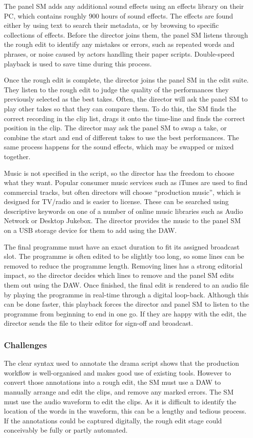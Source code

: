 The panel SM adds any additional sound effects using an effects library on their PC, which contains roughly 900 hours
of sound effects.  The effects are found either by using text to search their metadata, or by browsing to specific
collections of effects.  Before the director joins them, the panel SM listens through the rough edit to identify any
mistakes or errors, such as repeated words and phrases, or noise caused by actors handling their paper scripts.
Double-speed playback is used to save time during this process.

Once the rough edit is complete, the director joins the panel SM in the edit suite. They listen to the rough edit
to judge the quality of the performances they previously selected as the best takes.  Often, the director will ask the
panel SM to play other takes so that they can compare them.  To do this, the SM finds the correct recording in the clip
list, drags it onto the time-line and finds the correct position in the clip.  The director may ask the panel SM to swap
a take, or combine the start and end of different takes to use the best performances.  The same process happens for the
sound effects, which may be swapped or mixed together.

Music is not specified in the script, so the director has the freedom to choose what they want. Popular consumer music
services such as iTunes are used to find commercial tracks, but often directors will choose ``production music'', which
is designed for TV/radio and is easier to license. These can be searched using descriptive keywords on one of a
number of online music libraries such as Audio Network or Desktop Jukebox.  The director provides the music to the
panel SM on a USB storage device for them to add using the DAW.

The final programme must have an exact duration to fit its assigned broadcast slot. The programme is often edited to be
slightly too long, so some lines can be removed to reduce the programme length. Removing lines has a strong
editorial impact, so the director decides which lines to remove and the panel SM edits them out using the DAW.  Once
finished, the final edit is rendered to an audio file by playing the programme in real-time through a digital
loop-back. Although this can be done faster, this playback forces the director and panel SM to listen to the programme
from beginning to end in one go. If they are happy with the edit, the director sends the file to their editor for
sign-off and broadcast.

\subsubsection{Challenges}
The clear syntax used to annotate the drama script shows that the production workflow is well-organised and makes good
use of existing tools. However to convert those annotations into a rough edit, the SM must use a DAW to manually
arrange and edit the clips, and remove any marked errors. The SM must use the audio waveform to edit the clips.  As it
is difficult to identify the location of the words in the waveform, this can be a lengthy and tedious process. If the
annotations could be captured digitally, the rough edit stage could conceivably be fully or partly automated.

